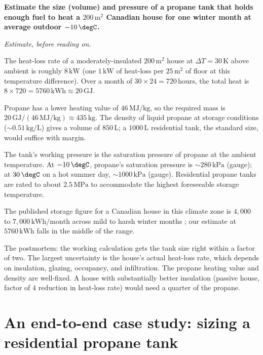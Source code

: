 \begin{estimation}
\textbf{Estimate the size (volume) and pressure of a propane tank that
holds enough fuel to heat a $200\,\text{m}^2$ Canadian house for one
winter month at average outdoor $-10\,\degC$.}

\smallskip
\textit{Estimate, before reading on.}

\smallskip
The heat-loss rate of a moderately-insulated $200\,\text{m}^2$ house
at $\Delta T = 30\,\si{\kelvin}$ above ambient is roughly
$8\,\text{kW}$ (one $1\,\text{kW}$ of heat-loss per $25\,\text{m}^2$
of floor at this temperature difference). Over a month of $30 \times
24 = 720\,\text{hours}$, the total heat is $8 \times 720 = 5760\,
\text{kWh} \approx 20\,\text{GJ}$.

Propane has a lower heating value of $46\,\text{MJ}/\text{kg}$, so
the required mass is $20\,\text{GJ}/(46\,\text{MJ}/\text{kg}) \approx
435\,\text{kg}$. The density of liquid propane at storage conditions
($\sim 0.51\,\text{kg}/\text{L}$) gives a volume of $850\,\text{L}$;
a $1000\,\text{L}$ residential tank, the standard size, would suffice
with margin.

The tank's working pressure is the saturation pressure of propane at
the ambient temperature. At $-10\,\degC$, propane's saturation
pressure is $\sim 280\,\text{kPa}$ (gauge); at $30\,\degC$ on a hot
summer day, $\sim 1000\,\text{kPa}$ (gauge). Residential propane
tanks are rated to about $2.5\,\text{MPa}$ to accommodate the highest
foreseeable storage temperature.

The published storage figure for a Canadian house in this climate
zone is $4{,}000$ to $7{,}000\,\text{kWh}/\text{month}$ across mild
to harsh winter months \cite{gen:mackay2009}; our estimate at $5760\,
\text{kWh}$ falls in the middle of the range.

The postmortem: the working calculation gets the tank size right
within a factor of two. The largest uncertainty is the house's actual
heat-loss rate, which depends on insulation, glazing, occupancy, and
infiltration. The propane heating value and density are well-fixed.
A house with substantially better insulation (passive house, factor
of $4$ reduction in heat-loss rate) would need a quarter of the
propane.
\end{estimation}

\section{An end-to-end case study: sizing a residential propane
tank}

